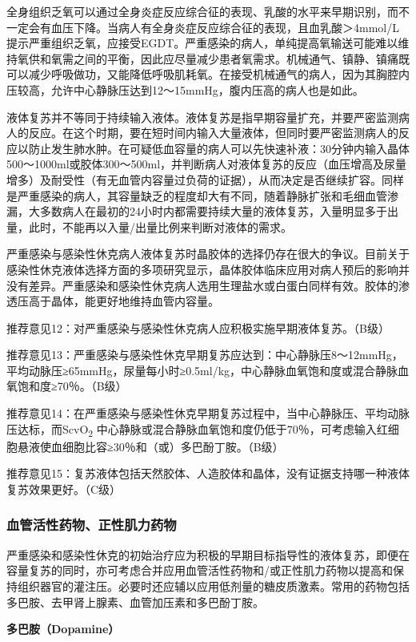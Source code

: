 全身组织乏氧可以通过全身炎症反应综合征的表现、乳酸的水平来早期识别，而不一定会有血压下降。当病人有全身炎症反应综合征的表现，且血乳酸＞4mmol/L提示严重组织乏氧，应接受EGDT。严重感染的病人，单纯提高氧输送可能难以维持氧供和氧需之间的平衡，因此应尽量减少患者氧需求。机械通气、镇静、镇痛既可以减少呼吸做功，又能降低呼吸肌耗氧。在接受机械通气的病人，因为其胸腔内压较高，允许中心静脉压达到12～15mmHg，腹内压高的病人也是如此。

液体复苏并不等同于持续输入液体。液体复苏是指早期容量扩充，并要严密监测病人的反应。在这个时期，要在短时间内输入大量液体，但同时要严密监测病人的反应以防止发生肺水肿。在可疑低血容量的病人可以先快速补液：30分钟内输入晶体500～1000ml或胶体300～500ml，并判断病人对液体复苏的反应（血压增高及尿量增多）及耐受性（有无血管内容量过负荷的证据），从而决定是否继续扩容。同样是严重感染的病人，其容量缺乏的程度却大有不同，随着静脉扩张和毛细血管渗漏，大多数病人在最初的24小时内都需要持续大量的液体复苏，入量明显多于出量，此时，不能再以入量/出量比例来判断对液体的需求。

严重感染与感染性休克病人液体复苏时晶胶体的选择仍存在很大的争议。目前关于感染性休克液体选择方面的多项研究显示，晶体胶体临床应用对病人预后的影响并没有差异。严重感染和感染性休克病人选用生理盐水或白蛋白同样有效。胶体的渗透压高于晶体，能更好地维持血管内容量。

推荐意见12：对严重感染与感染性休克病人应积极实施早期液体复苏。（B级）

推荐意见13：严重感染与感染性休克早期复苏应达到：中心静脉压8～12mmHg，平均动脉压≥65mmHg，尿量每小时≥0.5ml/kg，中心静脉血氧饱和度或混合静脉血氧饱和度≥70％。（B级）

推荐意见14：在严重感染与感染性休克早期复苏过程中，当中心静脉压、平均动脉压达标，而ScvO\textsubscript{2}
中心静脉或混合静脉血氧饱和度仍低于70％，可考虑输入红细胞悬液使血细胞比容≥30％和（或）多巴酚丁胺。（B级）

推荐意见15：复苏液体包括天然胶体、人造胶体和晶体，没有证据支持哪一种液体复苏效果更好。（C级）

\subsubsection{血管活性药物、正性肌力药物}

严重感染和感染性休克的初始治疗应为积极的早期目标指导性的液体复苏，即便在容量复苏的同时，亦可考虑合并应用血管活性药物和/或正性肌力药物以提高和保持组织器官的灌注压。必要时还应辅以应用低剂量的糖皮质激素。常用的药物包括多巴胺、去甲肾上腺素、血管加压素和多巴酚丁胺。

\textbf{多巴胺（Dopamine）}

